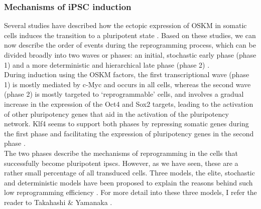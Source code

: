 
\subsubsection{Mechanisms of iPSC induction}


Several studies have described how the ectopic expression of OSKM in somatic cells induces the transition to a pluripotent state \cite{yamanaka2007strategies, brambrink2008sequential, stadtfeld2008induced, polo2012molecular, hansson2012highly, buganim2012single}. 
Based on these studies, we can now describe the order of events during the reprogramming process, which can be divided broadly into two waves or phases: an initial, stochastic early phase (phase 1) and a more deterministic and hierarchical late phase (phase 2) \cite{omole2018ten, takahashi2016decade, brouwer2016choices}.\\

During induction using the OSKM factors, the first transcriptional wave (phase 1) is mostly mediated by c-Myc and occurs in all cells, whereas the second wave (phase 2) is mostly targeted to `reprogrammable' cells, and involves a gradual increase in the expression of the Oct4 and Sox2 targets, leading to the activation of other pluripotency genes that aid in the activation of the pluripotency network. 
Klf4 seems to support both phases by repressing somatic genes during the first phase and facilitating the expression of pluripotency genes in the second phase \cite{buganim2013mechanisms}.\\

The two phases describe the mechanisms of reprogramming in the cells that successfully become pluripotent \glspl{ipsc}.
However, as we have seen, these are a rather small percentage of all transduced cells.
Three models, the elite, stochastic and deterministic models have been proposed to explain the reasons behind such low reprogramming efficiency \cite{omole2018ten}.
For more detail into these three models, I refer the reader to Takahashi \& Yamanaka \cite{takahashi2016decade}.

